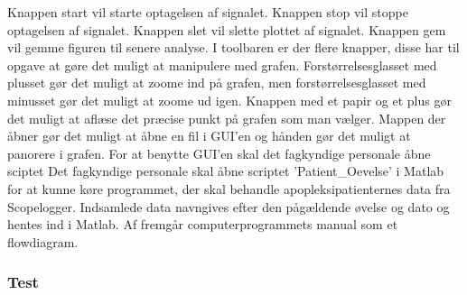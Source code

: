 Knappen start vil starte optagelsen af signalet. Knappen stop vil stoppe optagelsen af signalet. Knappen slet vil slette plottet af signalet. Knappen gem vil gemme figuren til senere analyse.
I toolbaren er der flere knapper, disse har til opgave at gøre det muligt at manipulere med grafen. Forstørrelsesglasset med plusset gør det muligt at zoome ind på grafen, men forstørrelsesglasset med minusset gør det muligt at zoome ud igen. Knappen med et papir og et plus gør det muligt at aflæse det præcise punkt på grafen som man vælger. Mappen der åbner gør det muligt at åbne en fil i GUI'en og hånden gør det muligt at panorere i grafen.
For at benytte GUI'en skal det fagkyndige personale åbne sciptet
Det fagkyndige personale skal åbne scriptet 'Patient_Oevelse' i Matlab for at kunne køre programmet, der skal behandle apopleksipatienternes data fra Scopelogger. Indsamlede data navngives efter den pågældende øvelse og dato og hentes ind i Matlab. Af  fremgår computerprogrammets manual som et flowdiagram.



\subsubsection{Test}




